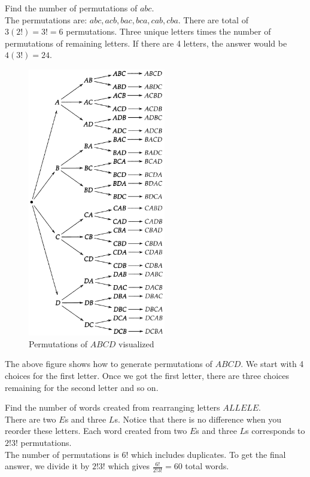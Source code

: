 \documentclass[12pt, a4paper]{article}
\newcounter{exa}
\begin{document}
\begin{texample}
Find the number of permutations of $abc$. \\

The permutations are: $abc, acb, bac, bca, cab, cba$. There are total of $3(2!)=3!=6$ permutations. Three unique letters times the number of permutations of remaining letters. If there are 4 letters, the answer would be $4(3!)=24$.
\end{texample}

\begin{figure}[H]
\centering
\includegraphics[width=60mm]{1.png}
\caption{Permutations of $ABCD$ visualized}
\end{figure}

The above figure shows how to generate permutations of $ABCD$. We start with 4 choices for the first letter. Once we got the first letter, there are three choices remaining for the second letter and so on.

\begin{texample}
Find the number of words created from rearranging letters $ALLELE$. \\

There are two $E$s and three $L$s. Notice that there is no difference when you reorder these letters. Each word created from two $E$s and three $L$s corresponds to $2!3!$ permutations. \\

The number of permutations is $6!$ which includes duplicates. To get the final answer, we divide it by $2!3!$ which gives $\frac{6!}{2!3!}=60$ total words.
\end{texample}
\end{document}
